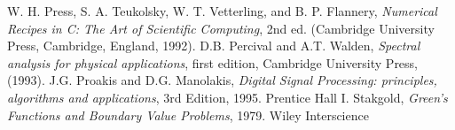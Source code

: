 \begin{thebibliography}{0}
W. H. Press, S. A. Teukolsky, W. T. Vetterling, and B. P. Flannery,
  \textit{Numerical Recipes in C: The Art of Scientific Computing}, 2nd ed.
  (Cambridge University Press, Cambridge, England, 1992).
D.B. Percival and A.T. Walden, {\it Spectral analysis for physical applications}, first edition, Cambridge University Press, (1993).
J.G. Proakis and D.G. Manolakis, {\it Digital
Signal Processing: principles, algorithms and applications},
3rd Edition, 1995.
Prentice Hall
I. Stakgold, {\it Green's Functions and Boundary Value Problems},
1979.
Wiley Interscience
\end{thebibliography}
